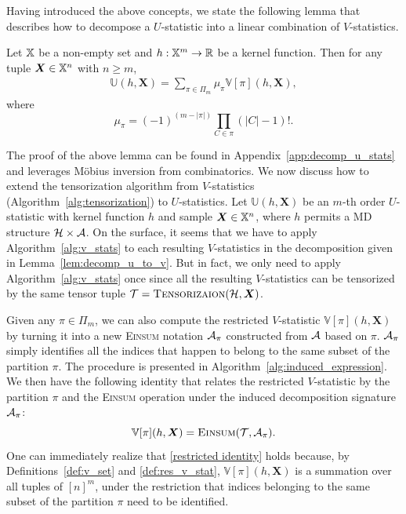 \documentclass[letterpaper,11pt]{article}
\def\Einsum{\textsc{Einsum}}
\newcommand{\mobius}{M\"obius}
\newcommand{\sPi}{\pi}
\newcommand{\ustat}{\mathbb{U}}
\newcommand{\vstat}{\mathbb{V}}
\newcommand{\ustatp}[2]{\ustat(#1,#2)}
\newcommand{\samplespace}{\bbX}
\newcommand{\partition}{\Pi}
\newcommand{\partitionp}[1]{\partition_{#1}}
\newcommand{\tensorcontraction}{\textsc{Einsum}}
\begin{document}
\begin{bibunit}[plainnat]
Having introduced the above concepts, we state the following lemma that describes how to decompose a $U$-statistic into a linear combination of $V$-statistics.

\begin{lemma}
\label{lem:decomp_u_to_v}
Let ${\mathbb{X}}$ be a non-empty set and $h: {\mathbb{X}}^{m} \rightarrow {\mathbb{R}}$ be a kernel function. Then for any tuple $\bm{X} \in {\mathbb{X}}^{n}$ with $n \geq m$,
\begin{align*}
    \ustat(h,\bm{X}) = \sum_{\sPi \in \partitionp{m}} 
    \mu_\sPi \vstat[\sPi](h, \bm{X}), 
\end{align*}
where
\begin{equation*}
    \mu_\sPi = (-1)^{(m-|\sPi|)} \prod_{C \in \sPi} (|C| - 1)!. 
\end{equation*}
\end{lemma}

The proof of the above lemma can be found in Appendix~\ref{app:decomp_u_stats} and leverages \mobius{} inversion from combinatorics. We now discuss how to extend the tensorization algorithm from $V$-statistics (Algorithm~\ref{alg:tensorization}) to $U$-statistics. Let $\ustatp{h}{\bm{X}}$ be an $m$-th order $U$-statistic with kernel function $h$ and sample $\bm{X} \in \samplespace^n$, where $h$ permits a MD structure ${\mathcal{H}} \times {\mathcal{A}}$. On the surface, it seems that we have to apply Algorithm~\ref{alg:v_stats} to each resulting $V$-statistics in the decomposition given in Lemma~\ref{lem:decomp_u_to_v}. But in fact, we only need to apply Algorithm~\ref{alg:v_stats} once since all the resulting $V$-statistics can be tensorized by the same tensor tuple ${\mathcal{T}} = \textsc{Tensorizaion} ({\mathcal{H}}, \bm{X})$. 

Given any $\pi \in \partitionp{m}$, we can also compute the restricted $V$-statistic $\vstat[\pi] (h, \bm{X})$ by turning it into a new \Einsum{} notation ${\mathcal{A}}_{\pi}$ constructed from ${\mathcal{A}}$ based on $\pi$. ${\mathcal{A}}_{\pi}$ simply identifies all the indices that happen to belong to the same subset of the partition $\pi$. The procedure is presented in Algorithm~\ref{alg:induced_expression}. We then have the following identity that relates the restricted $V$-statistic by the partition $\sPi$ and the \Einsum{} operation under the induced decomposition signature ${\mathcal{A}}_{\pi}$:
\begin{equation}
\label{restricted identity}
\vstat[\sPi](h, \bm{X}) =  \tensorcontraction(\calT, \calA_\sPi).
\end{equation}
One can immediately realize that \eqref{restricted identity} holds because, by Definitions~\ref{def:v_set} and \ref{def:res_v_stat}, $\vstat[\pi](h, \bm{X})$ is a summation over all tuples of $[n]^m$, under the restriction that indices belonging to the same subset of the partition $\pi$ need to be identified.


\end{bibunit}
\end{document}

